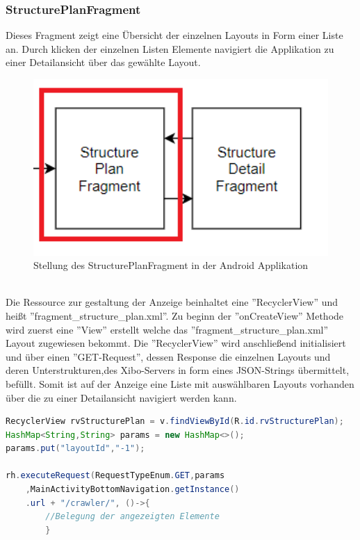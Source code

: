 \subsubsection{StructurePlanFragment}
Dieses Fragment zeigt eine Übersicht der einzelnen Layouts in Form einer Liste an. Durch klicken der einzelnen Listen Elemente navigiert die Applikation zu einer Detailansicht über das gewählte Layout.
\\
\begin{figure}[H]
\centering
\includegraphics[width=1.0\textwidth]{images/06_AndroidApp/06_StructurePlanStellung}
\caption{Stellung des StructurePlanFragment in der Android Applikation}
\label{fig:mediaNav}
\end{figure}
\\	
Die Ressource zur gestaltung der Anzeige beinhaltet eine ''RecyclerView'' und heißt ''fragment\_structure\_plan.xml''. Zu beginn der ''onCreateView'' Methode wird zuerst eine ''View'' erstellt welche das ''fragment\_structure\_plan.xml'' Layout zugewiesen bekommt. Die ''RecyclerView'' wird anschließend initialisiert und über einen ''GET-Request'', dessen Response die einzelnen Layouts und deren Unterstrukturen,des Xibo-Servers in form eines JSON-Strings übermittelt, befüllt. Somit ist auf der Anzeige eine Liste mit auswählbaren Layouts vorhanden über die zu einer Detailansicht navigiert werden kann. 
\begin{lstlisting}[language=Java,caption={Abfrage und anzeigen der Daten im StructurePlanFragment}]
RecyclerView rvStructurePlan = v.findViewById(R.id.rvStructurePlan);
HashMap<String,String> params = new HashMap<>();
params.put("layoutId","-1");
    
rh.executeRequest(RequestTypeEnum.GET,params
	,MainActivityBottomNavigation.getInstance()
	.url + "/crawler/", ()->{
		//Belegung der angezeigten Elemente
		}
\end{lstlisting}

